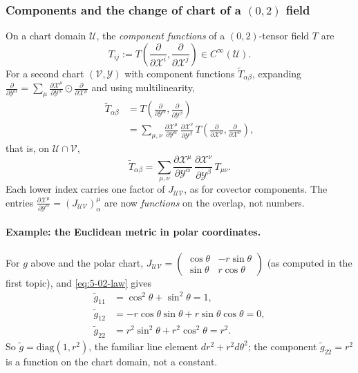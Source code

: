 \documentclass[11pt]{article}
\begin{document}
\subsubsection*{Components and the change of chart of a $(0,2)$ field}
On a chart domain $\mathcal U$, the \emph{component functions} of a $(0,2)$-tensor field $T$ are
\[
T_{ij}:=T\!\left(\frac{\partial}{\partial\mathcal X^i},\frac{\partial}{\partial\mathcal X^j}\right)\in C^\infty(\mathcal U).
\]
For a second chart $(\mathcal V,\mathcal Y)$ with component functions $\widetilde T_{\alpha\beta}$, expanding $\frac{\partial}{\partial\mathcal Y^\alpha}=\sum_\mu\frac{\partial\mathcal X^\mu}{\partial\mathcal Y^\alpha}\odot\frac{\partial}{\partial\mathcal X^\mu}$ and using multilinearity,
\begin{align*}
\widetilde T_{\alpha\beta}&=T\!\left(\frac{\partial}{\partial\mathcal Y^\alpha},\frac{\partial}{\partial\mathcal Y^\beta}\right)\\
&=\sum_{\mu,\nu}\frac{\partial\mathcal X^\mu}{\partial\mathcal Y^\alpha}\,\frac{\partial\mathcal X^\nu}{\partial\mathcal Y^\beta}\,T\!\left(\frac{\partial}{\partial\mathcal X^\mu},\frac{\partial}{\partial\mathcal X^\nu}\right),
\end{align*}
that is, on $\mathcal U\cap\mathcal V$,
\begin{equation}
\widetilde T_{\alpha\beta}=\sum_{\mu,\nu}\frac{\partial\mathcal X^\mu}{\partial\mathcal Y^\alpha}\,\frac{\partial\mathcal X^\nu}{\partial\mathcal Y^\beta}\,T_{\mu\nu}.
\tag{5.7}\label{eq:5-02-law}
\end{equation}
Each lower index carries one factor of $J_{\mathcal{UV}}$, as for covector components. The entries $\frac{\partial\mathcal X^\mu}{\partial\mathcal Y^\alpha}=(J_{\mathcal{UV}})^\mu_\alpha$ are now \emph{functions} on the overlap, not numbers.

\paragraph{Example: the Euclidean metric in polar coordinates.} For $g$ above and the polar chart, $J_{\mathcal{UV}}=\begin{pmatrix}\cos\theta&-r\sin\theta\\\sin\theta&r\cos\theta\end{pmatrix}$ (as computed in the first topic), and \eqref{eq:5-02-law} gives
\begin{align*}
\widetilde g_{11}&=\cos^2\theta+\sin^2\theta=1,\\
\widetilde g_{12}&=-r\cos\theta\sin\theta+r\sin\theta\cos\theta=0,\\
\widetilde g_{22}&=r^2\sin^2\theta+r^2\cos^2\theta=r^2.
\end{align*}
So $\widetilde g=\mathrm{diag}(1,r^2)$, the familiar line element $dr^2+r^2d\theta^2$; the component $\widetilde g_{22}=r^2$ is a function on the chart domain, not a constant.
\end{document}
